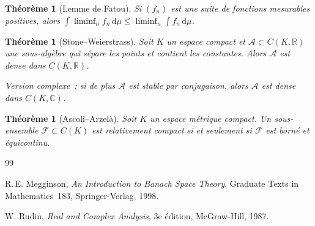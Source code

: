 \documentclass[a4paper,12pt]{book}
\newcommand{\R}{\mathbb{R}}
\newcommand{\C}{\mathbb{C}}
\newcommand{\dd}{\mathrm{d}}
\theoremstyle{definition}
\theoremstyle{plain}
\newtheorem{theoreme}[definition]{Théorème}
\theoremstyle{remark}
\begin{document}
\begin{theoreme}[Lemme de Fatou]
\label{thm:fatou}
Si $(f_n)$ est une suite de fonctions mesurables positives, alors
$\int \liminf_n f_n\,\dd\mu \le \liminf_n \int f_n\,\dd\mu$.
\end{theoreme}

\begin{theoreme}[Stone--Weierstrass]
\label{thm:stone-weierstrass-rappel}
Soit $K$ un espace compact et $\mathcal{A} \subset C(K, \R)$ une sous-algèbre qui sépare
les points et contient les constantes. Alors $\mathcal{A}$ est dense dans $C(K, \R)$.

Version complexe~: si de plus $\mathcal{A}$ est stable par conjugaison, alors
$\mathcal{A}$ est dense dans $C(K, \C)$.
\end{theoreme}

\begin{theoreme}[Ascoli--Arzelà]
\label{thm:ascoli}
Soit $K$ un espace métrique compact. Un sous-ensemble $\mathcal{F} \subset C(K)$ est
relativement compact si et seulement si $\mathcal{F}$ est borné et équicontinu.
\end{theoreme}


\begin{thebibliography}{99}

R.\,E. Megginson,
\emph{An Introduction to Banach Space Theory},
Graduate Texts in Mathematics~183, Springer-Verlag, 1998.

W. Rudin,
\emph{Real and Complex Analysis},
3e édition, McGraw-Hill, 1987.

\end{thebibliography}

\printindex
\end{document}
